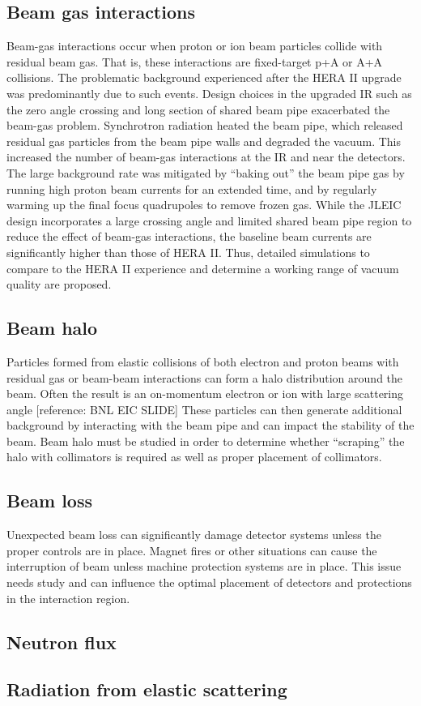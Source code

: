 \subsection{Beam gas interactions}

Beam-gas interactions occur when proton or ion beam particles collide with residual beam gas.  That is, these interactions are fixed-target p+A or A+A collisions.  The problematic background experienced after the HERA II upgrade was predominantly due to such events.  Design choices in the upgraded IR such as the zero angle crossing and long section of shared beam pipe exacerbated the beam-gas problem.  Synchrotron radiation heated the beam pipe, which released residual gas particles from the beam pipe walls and degraded the vacuum.  This increased the number of beam-gas interactions at the IR and near the detectors.  The large background rate was mitigated by “baking out” the beam pipe gas by running high proton beam currents for an extended time, and by regularly warming up the final focus quadrupoles to remove frozen gas.  
While the JLEIC design incorporates a large crossing angle and limited shared beam pipe region to reduce the effect of beam-gas interactions, the baseline beam currents are significantly higher than those of HERA II.  Thus, detailed simulations to compare to the HERA II experience and determine a working range of vacuum quality are proposed. 

\subsection{Beam halo}

Particles formed from elastic collisions of both electron and proton beams with residual gas or beam-beam interactions can form a halo distribution around the beam.  Often the result is an on-momentum electron or ion with large scattering angle [reference: BNL EIC SLIDE] These particles can then generate additional background by interacting with the beam pipe and can impact the stability of the beam.  Beam halo must be studied in order to determine whether “scraping” the halo with collimators is required as well as proper placement of collimators.

\subsection{Beam loss}

Unexpected beam loss can significantly damage detector systems unless the proper controls are in place.  Magnet fires or other situations can cause the interruption of beam unless machine protection systems are in place.  This issue needs study and can influence the optimal placement of detectors and protections in the interaction region.

\subsection{Neutron flux}

\subsection{Radiation from elastic scattering}
